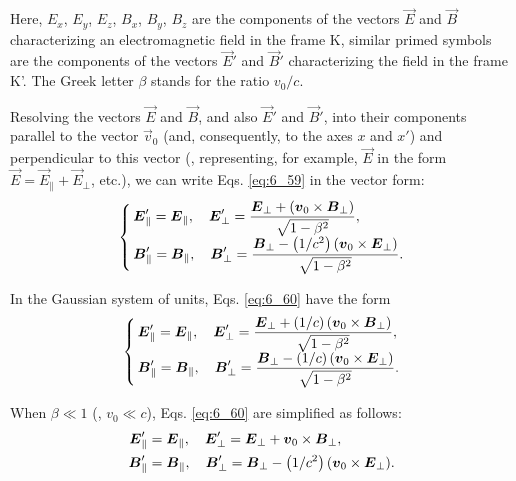 Here, $E_x$, $E_y$, $E_z$, $B_x$, $B_y$, $B_z$ are the components of the vectors $\vec{E}$ and $\vec{B}$ characterizing an electromagnetic field in the frame K, similar primed symbols are the components of the vectors $\vec{E}'$ and $\vec{B}'$ characterizing the field in the frame K'. The Greek letter $\beta$ stands for the ratio $v_0/c$.

Resolving the vectors $\vec{E}$ and $\vec{B}$, and also $\vec{E}'$ and $\vec{B}'$, into their components
parallel to the vector $\vec{v}_0$ (and, consequently, to the axes $x$ and $x'$) and perpendicular to this vector (\ie, representing, for example, $\vec{E}$ in the form $\vec{E}=\vec{E}_{\parallel}+\vec{E}_{\perp}$, etc.), we can write Eqs. \eqref{eq:6_59} in the vector form:
\begin{equation}\label{eq:6_60}
    \begin{cases}
        & \!\!\!\!\! \vec{E}_{\parallel}' = \vec{E}_{\parallel},\quad \vec{E}_{\perp}' = \dfrac{\vec{E}_{\perp} + (\vec{v}_0 \times \vec{B}_{\perp})}{\sqrt{1-\beta^2}},\\
        & \!\!\!\!\! \vec{B}_{\parallel}' = \vec{B}_{\parallel},\quad \vec{B}_{\perp}' = \dfrac{\vec{B}_{\perp}- \parenthesis{1/c^2} (\vec{v}_0 \times \vec{E}_{\perp})}{\sqrt{1-\beta^2}}.
    \end{cases}
\end{equation}

\noindent
In the Gaussian system of units, Eqs. \eqref{eq:6_60} have the form
\begin{equation}\label{eq:6_61}
    \begin{cases}
        & \!\!\!\!\! \vec{E}_{\parallel}' = \vec{E}_{\parallel},\quad \vec{E}_{\perp}' = \dfrac{\vec{E}_{\perp} + \parenthesis{1/c} (\vec{v}_0 \times \vec{B}_{\perp})}{\sqrt{1-\beta^2}},\\
        & \!\!\!\!\! \vec{B}_{\parallel}' = \vec{B}_{\parallel},\quad \vec{B}_{\perp}' = \dfrac{\vec{B}_{\perp}- \parenthesis{1/c} (\vec{v}_0 \times \vec{E}_{\perp})}{\sqrt{1-\beta^2}}.
    \end{cases}
\end{equation}

\noindent
When $\beta\ll 1$ (\ie, $v_0\ll c$), Eqs. \eqref{eq:6_60} are simplified as follows:
\begin{align*}
    \boldsymbol{E}_{\parallel}' &= \boldsymbol{E}_{\parallel},\quad \boldsymbol{E}_{\perp}' = \boldsymbol{E}_{\perp} + \boldsymbol{v}_0 \times \boldsymbol{B}_{\perp},\\
    \boldsymbol{B}_{\parallel}' &= \boldsymbol{B}_{\parallel},\quad \boldsymbol{B}_{\perp}' = \boldsymbol{B}_{\perp}-\left(1/c^2\right) (\boldsymbol{v}_0 \times \boldsymbol{E}_{\perp}).
\end{align*}

